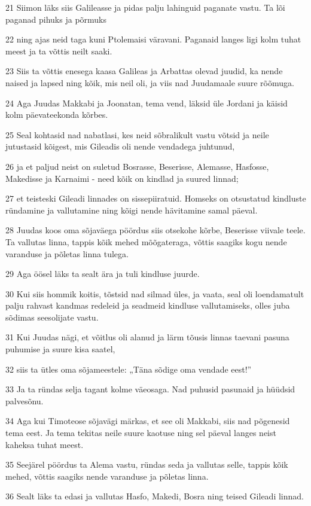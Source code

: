 \par 21 Siimon läks siis Galileasse ja pidas palju lahinguid paganate vastu. Ta lõi paganad pihuks ja põrmuks
\par 22 ning ajas neid taga kuni Ptolemaisi väravani. Paganaid langes ligi kolm tuhat meest ja ta võttis neilt saaki.
\par 23 Siis ta võttis enesega kaasa Galileas ja Arbattas olevad juudid, ka nende naised ja lapsed ning kõik, mis neil oli, ja viis nad Juudamaale suure rõõmuga.
\par 24 Aga Juudas Makkabi ja Joonatan, tema vend, läksid üle Jordani ja käisid kolm päevateekonda kõrbes.
\par 25 Seal kohtasid nad nabatlasi, kes neid sõbralikult vastu võtsid ja neile jutustasid kõigest, mis Gileadis oli nende vendadega juhtunud,
\par 26 ja et paljud neist on suletud Bosrasse, Beserisse, Alemasse, Hasfosse, Makedisse ja Karnaimi - need kõik on kindlad ja suured linnad;
\par 27 et teisteski Gileadi linnades on sissepiiratuid. Homseks on otsustatud kindluste ründamine ja vallutamine ning kõigi nende hävitamine samal päeval.
\par 28 Juudas koos oma sõjaväega pöördus siis otsekohe kõrbe, Beserisse viivale teele. Ta vallutas linna, tappis kõik mehed mõõgateraga, võttis saagiks kogu nende varanduse ja põletas linna tulega.
\par 29 Aga öösel läks ta sealt ära ja tuli kindluse juurde.
\par 30 Kui siis hommik koitis, tõstsid nad silmad üles, ja vaata, seal oli loendamatult palju rahvast kandmas redeleid ja seadmeid kindluse vallutamiseks, olles juba sõdimas seesolijate vastu.
\par 31 Kui Juudas nägi, et võitlus oli alanud ja lärm tõusis linnas taevani pasuna puhumise ja suure kisa saatel,
\par 32 siis ta ütles oma sõjameestele: „Täna sõdige oma vendade eest!”
\par 33 Ja ta ründas selja tagant kolme väeosaga. Nad puhusid pasunaid ja hüüdsid palvesõnu.
\par 34 Aga kui Timoteose sõjavägi märkas, et see oli Makkabi, siis nad põgenesid tema eest. Ja tema tekitas neile suure kaotuse ning sel päeval langes neist kaheksa tuhat meest.
\par 35 Seejärel pöördus ta Alema vastu, ründas seda ja vallutas selle, tappis kõik mehed, võttis saagiks nende varanduse ja põletas linna.
\par 36 Sealt läks ta edasi ja vallutas Hasfo, Makedi, Bosra ning teised Gileadi linnad.
